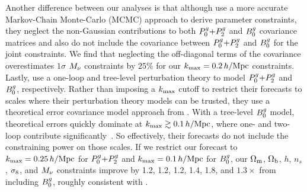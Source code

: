 Another difference between our analyses is that although \cite{chudaykin2019} use 
a more accurate Markov-Chain Monte-Carlo (MCMC) approach to derive parameter
constraints, they neglect the non-Gaussian contributions to both $P^g_0{+}P^g_2$ and
$B^g_0$ covariance matrices and also do not include the covariance between $P^g_0{+}P^g_2$
and $B^g_0$ for the joint constraints. We find that neglecting the off-diagonal
terms of the covariance overestimates $1\sigma$ $M_\nu$ constraints by $25\%$ 
for our $k_{\rm max}=0.2\,h/\mathrm{Mpc}$ constraints. Lastly, \cite{chudaykin2019} use a one-loop 
and tree-level perturbation theory to model $P^g_0{+}P^g_2$ and $B^g_0$, respectively.
Rather than imposing a $k_{\rm max}$ cutoff to restrict their forecasts to scales
where their perturbation theory models can be trusted, they use a theoretical
error covariance model approach from \cite{baldauf2016}. With a tree-level
$B^g_0$ model, theoretical errors quickly dominate at $k_{\rm max} \gtrsim 0.1\,h/\mathrm{Mpc}$,
where one- and two-loop contribute significantly~\citep[\eg][]{lazanu2018}. 
So effectively, their forecasts do not include the constraining power on
those scales. If we restrict our forecast to $k_{\rm max} = 0.25\,h/\mathrm{Mpc}$ 
for $P^g_0{+}P^g_2$ and $k_{\rm max} = 0.1\,h/\mathrm{Mpc}$ for $B^g_0$, our $\Omega_{\rm m}$, $\Omega_{\rm b}$, $h$, $n_s$, 
$\sigma_8$, and $M_\nu$ constraints improve by 1.2, 1.2, 1.2, 1.4, 1.8, and
$1.3\times$ from including $B^g_0$, roughly consistent with \cite{chudaykin2019}. 


